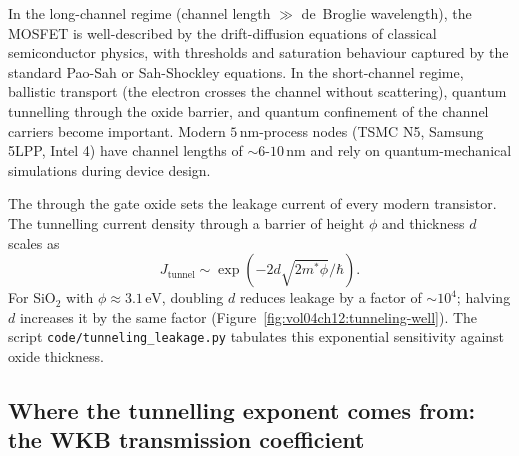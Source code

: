 In the long-channel regime (channel length $\gg$ de~Broglie
wavelength), the MOSFET is well-described by the drift-diffusion
equations of classical semiconductor physics, with thresholds and
saturation behaviour captured by the standard Pao-Sah or Sah-Shockley
equations. In the short-channel regime, ballistic transport (the
electron crosses the channel without scattering), quantum tunnelling
through the oxide barrier, and quantum confinement of the channel
carriers become important. Modern $5\,\si{\nano\meter}$-process
nodes (TSMC N5, Samsung 5LPP, Intel 4) have channel lengths of $\sim
6$-$10\,\si{\nano\meter}$ and rely on quantum-mechanical simulations
during device design.

The  through the gate oxide sets the
leakage current of every modern transistor. The tunnelling current
density through a barrier of height $\phi$ and thickness $d$ scales
as
\[
J_{\text{tunnel}} \sim \exp(-2d\sqrt{2m^{*}\phi}/\hbar).
\]
For SiO$_{2}$ with $\phi \approx 3.1\,\si{\electronvolt}$, doubling
$d$ reduces leakage by a factor of $\sim 10^{4}$; halving $d$
increases it by the same factor
(Figure~\ref{fig:vol04ch12:tunneling-well}). The script
\texttt{code/tunneling\_leakage.py} tabulates this exponential
sensitivity against oxide thickness.

\subsection{Where the tunnelling exponent comes from: the WKB
transmission coefficient}

